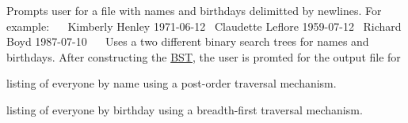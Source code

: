 Prompts user for a file with names and birthdays delimitted by newlines. For example\+:~\newline
~\newline
Kimberly Henley 1971-\/06-\/12~\newline
Claudette Leflore 1959-\/07-\/12~\newline
Richard Boyd 1987-\/07-\/10~\newline
~\newline
Uses a two different binary search trees for names and birthdays. After constructing the \hyperlink{class_b_s_t}{B\+ST}, the user is promted for the output file for
\begin{DoxyItemize}
\item listing of everyone by name using a post-\/order traversal mechanism.
\item listing of everyone by birthday using a breadth-\/first traversal mechanism. 
\end{DoxyItemize}
